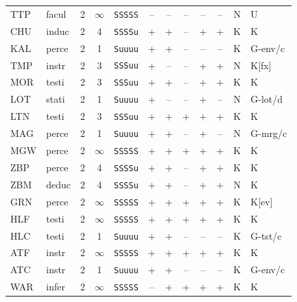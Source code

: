 {\begin{longtable}{@{}llcccccccccl@{}}
TTP & facul & 2 & $\infty$ & \texttt{SSSSS} & \textsf{--} & \textsf{--} & \textsf{--} & \textsf{--} & \textsf{--} & N & U \\
CHU & induc & 2 & 4 & \texttt{SSSSu} & \textsf{+} & \textsf{+} & \textsf{--} & \textsf{+} & \textsf{+} & K & K \\
KAL & perce & 2 & 1 & \texttt{Suuuu} & \textsf{+} & \textsf{+} & \textsf{--} & \textsf{--} & \textsf{--} & K & G-env/c \\
TMP & instr & 2 & 3 & \texttt{SSSuu} & \textsf{+} & \textsf{--} & \textsf{--} & \textsf{+} & \textsf{+} & N & K[fx] \\
MOR & testi & 2 & 3 & \texttt{SSSuu} & \textsf{+} & \textsf{+} & \textsf{--} & \textsf{+} & \textsf{+} & K & K \\
LOT & stati & 2 & 1 & \texttt{Suuuu} & \textsf{+} & \textsf{--} & \textsf{--} & \textsf{+} & \textsf{--} & N & G-lot/d \\
LTN & testi & 2 & 3 & \texttt{SSSuu} & \textsf{+} & \textsf{+} & \textsf{+} & \textsf{+} & \textsf{+} & K & K \\
MAG & perce & 2 & 1 & \texttt{Suuuu} & \textsf{+} & \textsf{+} & \textsf{--} & \textsf{+} & \textsf{--} & N & G-mrg/c \\
MGW & perce & 2 & $\infty$ & \texttt{SSSSS} & \textsf{+} & \textsf{+} & \textsf{+} & \textsf{+} & \textsf{+} & K & K \\
ZBP & perce & 2 & 4 & \texttt{SSSSu} & \textsf{+} & \textsf{+} & \textsf{--} & \textsf{+} & \textsf{+} & K & K \\
ZBM & deduc & 2 & 4 & \texttt{SSSSu} & \textsf{+} & \textsf{+} & \textsf{--} & \textsf{+} & \textsf{+} & N & K \\
GRN & perce & 2 & $\infty$ & \texttt{SSSSS} & \textsf{+} & \textsf{+} & \textsf{+} & \textsf{+} & \textsf{+} & K & K[ev] \\
HLF & testi & 2 & $\infty$ & \texttt{SSSSS} & \textsf{+} & \textsf{+} & \textsf{+} & \textsf{+} & \textsf{+} & K & K \\
HLC & testi & 2 & 1 & \texttt{Suuuu} & \textsf{+} & \textsf{+} & \textsf{--} & \textsf{--} & \textsf{--} & K & G-tst/c \\
ATF & instr & 2 & $\infty$ & \texttt{SSSSS} & \textsf{+} & \textsf{+} & \textsf{+} & \textsf{+} & \textsf{+} & K & K \\
ATC & instr & 2 & 1 & \texttt{Suuuu} & \textsf{+} & \textsf{+} & \textsf{--} & \textsf{--} & \textsf{--} & K & G-env/c \\
WAR & infer & 2 & $\infty$ & \texttt{SSSSS} & \textsf{--} & \textsf{+} & \textsf{+} & \textsf{+} & \textsf{+} & K & K \\

\end{longtable}}
